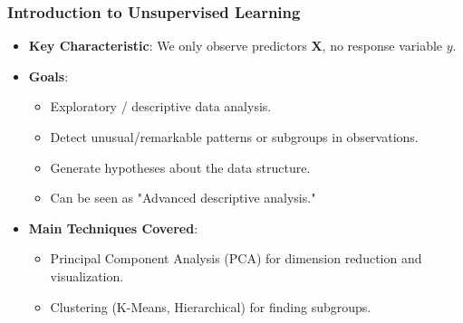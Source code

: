\documentclass[12pt,a4paper]{article}
\begin{document}
    \subsubsection{Introduction to Unsupervised Learning}
        \begin{itemize}
            \item \textbf{Key Characteristic}: We only observe predictors $\mathbf{X}$, no response variable $y$.
            \item \textbf{Goals}:
                \begin{itemize}
                    \item Exploratory / descriptive data analysis.
                    \item Detect unusual/remarkable patterns or subgroups in observations.
                    \item Generate hypotheses about the data structure.
                    \item Can be seen as "Advanced descriptive analysis."
                \end{itemize}
            \item \textbf{Main Techniques Covered}:
                \begin{itemize}
                    \item Principal Component Analysis (PCA) for dimension reduction and visualization.
                    \item Clustering (K-Means, Hierarchical) for finding subgroups.
                \end{itemize}
        \end{itemize}
\end{document}
